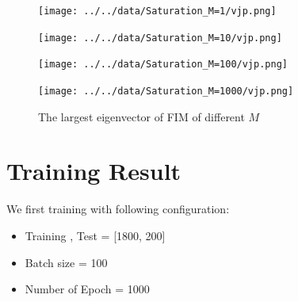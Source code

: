 \documentclass[
]{article}
\providecommand{\tightlist}{%
  \setlength{\itemsep}{0pt}\setlength{\parskip}{0pt}}\usepackage{longtable,booktabs,array}
\begin{document}
\begin{figure}

\begin{minipage}{0.25\linewidth}

\texttt{[image: ../../data/Saturation\_M=1/vjp.png]}

\end{minipage}%
%
\begin{minipage}{0.25\linewidth}

\texttt{[image: ../../data/Saturation\_M=10/vjp.png]}

\end{minipage}%
%
\begin{minipage}{0.25\linewidth}

\texttt{[image: ../../data/Saturation\_M=100/vjp.png]}

\end{minipage}%
%
\begin{minipage}{0.25\linewidth}

\texttt{[image: ../../data/Saturation\_M=1000/vjp.png]}

\end{minipage}%

\caption{\label{fig-eig1000}The largest eigenvector of FIM of different
\(M\)}

\end{figure}%

\section{Training Result}\label{training-result}

We first training with following configuration:

\begin{itemize}
\tightlist
\item
  Training , Test = {[}1800, 200{]}
\item
  Batch size = 100
\item
  Number of Epoch = 1000
\end{itemize}
\end{document}
